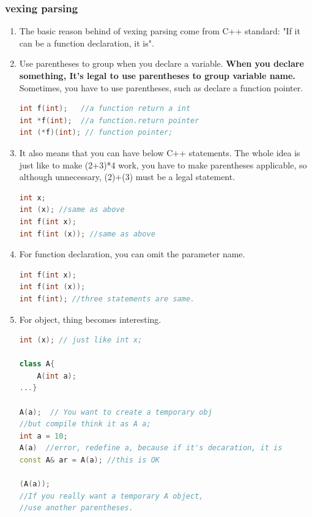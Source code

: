 \documentclass[a4paper,12pt,twoside]{book}
\begin{document}
\subsubsection{vexing parsing}
\begin{enumerate}
	\item The basic reason behind of vexing parsing come from C++ standard: "If it can be a function declaration, it is".
	
	\item Use parentheses to group when you declare a variable. \textbf{When you declare something, It's legal to use parentheses to group variable name.} Sometimes, you have to use parentheses, such as declare a function pointer. 
\begin{lstlisting}[frame=single, language=c++, mathescape=true]
int f(int);   //a function return a int
int *f(int);  //a function.return pointer
int (*f)(int); // function pointer;  
\end{lstlisting}
	
	\item It also means that you can have below C++ statements. The whole idea is just like to make (2+3)*4 work, you have to make parentheses applicable, so although unnecessary, (2)+(3) must be a legal statement.
\begin{lstlisting}[frame=single, language=c++, mathescape=true]
int x;
int (x); //same as above
int f(int x);
int f(int (x)); //same as above
\end{lstlisting}
	
	\item For function declaration, you can omit the parameter name.  
\begin{lstlisting}[frame=single, language=c++, mathescape=true]
int f(int x);
int f(int (x));
int f(int); //three statements are same. 
\end{lstlisting}
	
	\item For object, thing becomes interesting.
\begin{lstlisting}[frame=single, language=c++, mathescape=true]
int (x); // just like int x;

class A{
	A(int a);
...}
	
A(a);  // You want to create a temporary obj
//but compile think it as A a;
int a = 10;
A(a)  //error, redefine a, because if it's decaration, it is
const A& ar = A(a); //this is OK

(A(a)); 
//If you really want a temporary A object,
//use another parentheses. 
\end{lstlisting}
	

\end{enumerate}
\end{document}
